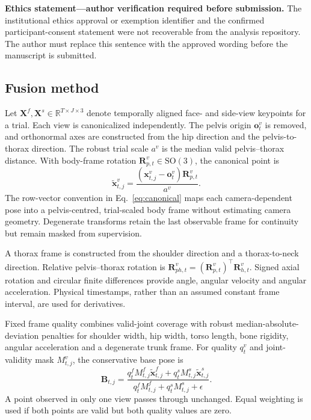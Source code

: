 \documentclass[lineno,pdflatex,sn-mathphys-num]{sn-jnl}
\begin{document}
\textbf{Ethics statement---author verification required before submission.}
The institutional ethics approval or exemption identifier and the confirmed
participant-consent statement were not recoverable from the analysis
repository. The author must replace this sentence with the approved wording
before the manuscript is submitted.

\subsection{Fusion method}

Let $\mathbf{X}^{f},\mathbf{X}^{s}\in\mathbb{R}^{T\times J\times3}$ denote
temporally aligned face- and side-view keypoints for a trial. Each view is
canonicalized independently. The pelvis origin $\mathbf{o}^{v}_{t}$ is removed,
and orthonormal axes are constructed from the hip direction and the
pelvis-to-thorax direction. The robust trial scale $a^v$ is the median valid
pelvis--thorax distance. With body-frame rotation
$\mathbf{R}^{v}_{p,t}\in\mathrm{SO}(3)$, the canonical point is
\begin{equation}
 \widetilde{\mathbf{x}}^{v}_{t,j}=
 \frac{(\mathbf{x}^{v}_{t,j}-\mathbf{o}^{v}_{t})
 \mathbf{R}^{v}_{p,t}}{a^v}.
 \label{eq:canonical}
\end{equation}
The row-vector convention in Eq.~\ref{eq:canonical} maps each camera-dependent
pose into a pelvis-centred, trial-scaled body frame without estimating camera
geometry. Degenerate transforms retain the last observable frame for
continuity but remain masked from supervision.

A thorax frame is constructed from the shoulder direction and a
thorax-to-neck direction. Relative pelvis--thorax rotation is
$\mathbf{R}^{v}_{ph,t}=(\mathbf{R}^{v}_{p,t})^\top
\mathbf{R}^{v}_{h,t}$. Signed axial rotation and circular finite differences
provide angle, angular velocity and angular acceleration. Physical timestamps,
rather than an assumed constant frame interval, are used for derivatives.

Fixed frame quality combines valid-joint coverage with robust
median-absolute-deviation penalties for shoulder width, hip width, torso
length, bone rigidity, angular acceleration and a degenerate trunk frame. For
quality $q^v_t$ and joint-validity mask $M^v_{t,j}$, the conservative base pose
is
\begin{equation}
 \mathbf{B}_{t,j}=
 \frac{q^f_tM^f_{t,j}\widetilde{\mathbf{x}}^f_{t,j}+
       q^s_tM^s_{t,j}\widetilde{\mathbf{x}}^s_{t,j}}
      {q^f_tM^f_{t,j}+q^s_tM^s_{t,j}+\epsilon}.
 \label{eq:base}
\end{equation}
A point observed in only one view passes through unchanged. Equal weighting is
used if both points are valid but both quality values are zero.
\end{document}
